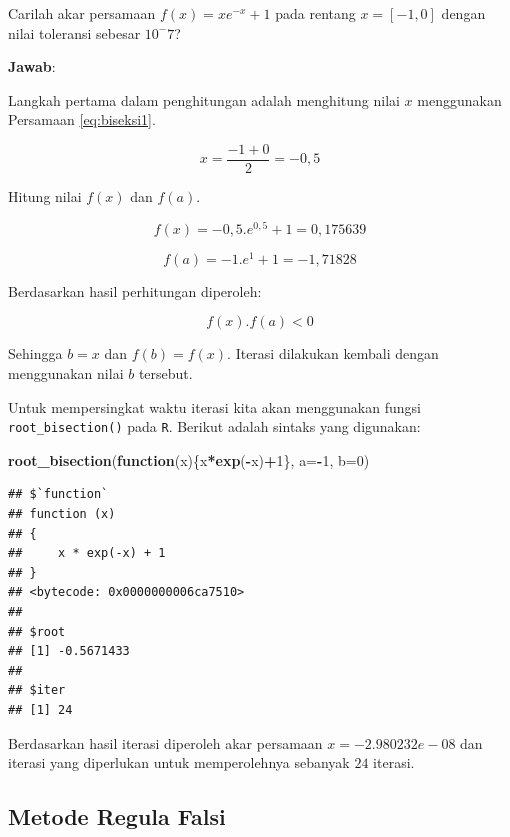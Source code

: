 \documentclass[]{book}
\newenvironment{Shaded}{\begin{snugshade}}{\end{snugshade}}
\newcommand{\ControlFlowTok}[1]{\textcolor[rgb]{0.13,0.29,0.53}{\textbf{#1}}}
\newcommand{\DataTypeTok}[1]{\textcolor[rgb]{0.13,0.29,0.53}{#1}}
\newcommand{\DecValTok}[1]{\textcolor[rgb]{0.00,0.00,0.81}{#1}}
\newcommand{\KeywordTok}[1]{\textcolor[rgb]{0.13,0.29,0.53}{\textbf{#1}}}
\newcommand{\NormalTok}[1]{#1}
\newcommand{\OperatorTok}[1]{\textcolor[rgb]{0.81,0.36,0.00}{\textbf{#1}}}
\theoremstyle{definition}
\theoremstyle{definition}
\theoremstyle{definition}
\theoremstyle{remark}
\let\BeginKnitrBlock\begin \let\EndKnitrBlock\end
\begin{document}
\BeginKnitrBlock{example}
\protect\hypertarget{exm:biseksexmp}{}{\label{exm:biseksexmp} }Carilah akar persamaan \(f\left(x \right)=xe^{-x}+1\) pada rentang \(x=\left[-1,0 \right]\) dengan nilai toleransi sebesar \(10^-7\)?
\EndKnitrBlock{example}

\textbf{Jawab}:

Langkah pertama dalam penghitungan adalah menghitung nilai \(x\) menggunakan Persamaan \eqref{eq:biseksi1}.

\[
x=\frac{-1+0}{2}=-0,5
\]

Hitung nilai \(f\left(x \right)\) dan \(f\left(a \right)\).

\[
f\left(x \right)=-0,5.e^{0,5}+1=0,175639
\]

\[
f\left(a \right)=-1.e^{1}+1=-1,71828
\]

Berdasarkan hasil perhitungan diperoleh:

\[
f\left(x \right).f\left(a \right)<0
\]

Sehingga \(b=x\) dan \(f\left(b \right)=f\left(x \right)\). Iterasi dilakukan kembali dengan menggunakan nilai \(b\) tersebut.

Untuk mempersingkat waktu iterasi kita akan menggunakan fungsi \texttt{root\_bisection()} pada \texttt{R}. Berikut adalah sintaks yang digunakan:

\begin{Shaded}
\begin{Highlighting}[]
\KeywordTok{root_bisection}\NormalTok{(}\ControlFlowTok{function}\NormalTok{(x)\{x}\OperatorTok{*}\KeywordTok{exp}\NormalTok{(}\OperatorTok{-}\NormalTok{x)}\OperatorTok{+}\DecValTok{1}\NormalTok{\},}
               \DataTypeTok{a=}\OperatorTok{-}\DecValTok{1}\NormalTok{, }\DataTypeTok{b=}\DecValTok{0}\NormalTok{)}
\end{Highlighting}
\end{Shaded}

\begin{verbatim}
## $`function`
## function (x) 
## {
##     x * exp(-x) + 1
## }
## <bytecode: 0x0000000006ca7510>
## 
## $root
## [1] -0.5671433
## 
## $iter
## [1] 24
\end{verbatim}

Berdasarkan hasil iterasi diperoleh akar persamaan \(x=-2.980232e-08\) dan iterasi yang diperlukan untuk memperolehnya sebanyak \(24\) iterasi.

\hypertarget{regulafalsi}{%
\subsection{Metode Regula Falsi}\label{regulafalsi}}
\end{document}
